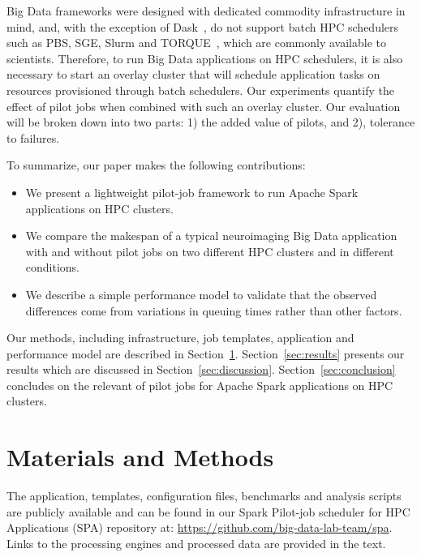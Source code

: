 \documentclass{IEEEtran}
\begin{document}
Big Data frameworks were designed with dedicated commodity infrastructure
in mind, and, with the exception of Dask~\cite{rocklin2015dask}, do not support batch
HPC schedulers such as PBS, SGE, Slurm and TORQUE~\cite{schedulers}, which
are commonly available to scientists. Therefore, to run Big Data
applications on HPC schedulers, it is also necessary to start an overlay
cluster that will schedule application tasks on resources provisioned
through batch schedulers. Our experiments quantify the effect of pilot jobs
when combined with such an overlay cluster. Our evaluation will be broken
down into two parts:
1) the added value of pilots, and 2), tolerance to failures.

To summarize, our paper
makes the following contributions:
\begin{itemize}
\item We present a lightweight pilot-job framework to run Apache Spark
applications on HPC clusters.
\item We compare the makespan of a typical neuroimaging Big Data
application with and without pilot jobs on two different HPC clusters and
in different conditions.
\item We describe a simple performance model to validate that the observed
differences come from variations in queuing times rather than other
factors.
\end{itemize}
Our methods, including infrastructure, job templates, application and
performance model are described in Section~\ref{sec:methods}.
Section~\ref{sec:results} presents our results which are discussed in
Section~\ref{sec:discussion}. Section~\ref{sec:conclusion} concludes on the 
relevant of pilot jobs for Apache Spark applications on HPC clusters.

\section{Materials and Methods}\label{sec:methods}

    The application, templates, configuration files, benchmarks and
    analysis scripts are publicly available and can be found in our Spark
    Pilot-job scheduler for HPC Applications (SPA) repository at:
    \href{https://github.com/big-data-lab-team/spa}{https://github.com/big-data-lab-team/spa}.
    Links to the processing engines and processed data are provided in the
    text.
    
\end{document}

